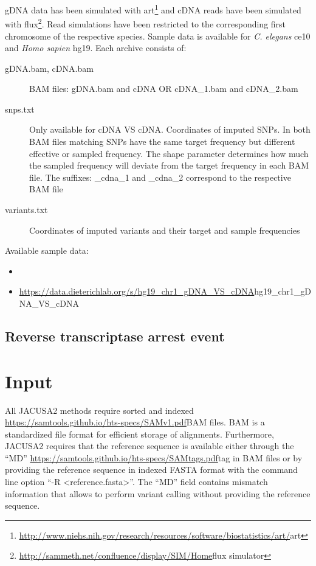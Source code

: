 \documentclass[10pt,a4paper]{article}
\begin{document}
gDNA data has been simulated with
art\footnote{\url{http://www.niehs.nih.gov/research/resources/software/biostatistics/art/}{art}}
and cDNA reads have been simulated with
flux\footnote{\url{http://sammeth.net/confluence/display/SIM/Home}{flux simulator}}. Read
simulations have been restricted to the corresponding first chromosome of the respective species.
Sample data is available for \textit{C. elegans} ce10 and \textit{Homo sapien} hg19. Each archive
consists of:
\begin{description}
  \item[gDNA.bam, cDNA.bam] BAM files: gDNA.bam and cDNA OR cDNA\_1.bam and cDNA\_2.bam
  \item[snps.txt] Only available for cDNA VS cDNA. Coordinates of imputed SNPs. In both
  BAM files matching SNPs have the same target frequency but different effective or sampled
  frequency. The shape parameter determines how much the sampled frequency will deviate from the
  target frequency in each BAM file. The suffixes: \_cdna\_1 and \_cdna\_2 correspond to the
  respective BAM file
  \item[variants.txt] Coordinates of imputed variants and their target and sample
  frequencies
\end{description}
Available sample data:
\begin{itemize}
  \item
  \item \url{https://data.dieterichlab.org/s/hg19_chr1_gDNA_VS_cDNA}{hg19\_chr1\_gDNA\_VS\_cDNA}
\end{itemize}
\subsection{Reverse transcriptase arrest event}
\section{Input}
All JACUSA2 methods require sorted and indexed \url{https://samtools.github.io/hts-specs/SAMv1.pdf}{BAM} files.
BAM is a standardized file format for efficient storage of alignments.
Furthermore, JACUSA2 requires that the reference sequence is available either through the ``MD'' 
\url{https://samtools.github.io/hts-specs/SAMtags.pdf}{tag} in BAM files or by providing the reference 
sequence in indexed FASTA format with the command line option ``-R <reference.fasta>''.
The ``MD'' field contains mismatch information that allows to perform variant calling without providing the reference sequence.    
\end{document}

